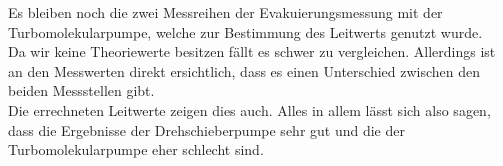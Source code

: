 \noindent
Es bleiben noch die zwei Messreihen der Evakuierungsmessung mit der Turbomolekularpumpe, welche zur Bestimmung des Leitwerts genutzt wurde.\\
Da wir keine Theoriewerte besitzen fällt es schwer zu vergleichen. Allerdings ist an den Messwerten direkt ersichtlich, dass es einen Unterschied zwischen den beiden Messstellen gibt.\\
Die errechneten Leitwerte zeigen dies auch. 
Alles in allem lässt sich also sagen, dass die Ergebnisse der Drehschieberpumpe sehr gut und die der Turbomolekularpumpe eher schlecht sind.

